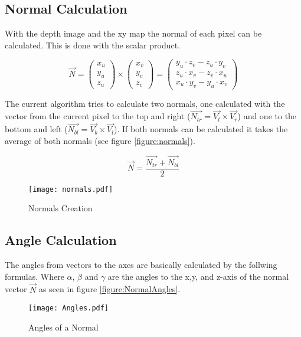 \subsection{Normal Calculation}
With the depth image and the xy map the normal of each pixel can be calculated. This is done with the scalar product.


$$ \vec{N} = \left( \begin{array}{c} x_u \\ y_u \\ z_u \end{array} \right) \times \left( \begin{array}{c} x_v \\ y_v \\ z_v \end{array} \right) 
= \left( \begin{array}{c} y_u \cdot z_v - z_u \cdot y_v \\ z_u \cdot x_v - z_v \cdot x_u \\ x_u \cdot y_v - y_u \cdot x_v \end{array}\right)
$$

The current algorithm tries to calculate two normals, one calculated with the vector from the current pixel to the top and right 
($\vec{N_{tr}}=\vec{V_t}\times\vec{V_r}$) and one to
the bottom and left ($\vec{N_{bl}}=\vec{V_b}\times\vec{V_l}$). 
If both normals can be calculated it takes the average of both normals (see figure \vref{figure:normals}).

$$ \vec{N} = \frac{\vec{N_{tr}} + \vec{N_{bl}}}{2}$$

\begin{figure}[htp]
\begin{center}
  \texttt{[image: normals.pdf]}
  \caption{Normals Creation}
  \label{figure:normals}
\end{center}
\end{figure}

\subsection{Angle Calculation}

The angles from vectors to the axes are basically calculated by the follwing formulas. Where $\alpha$, $\beta$ and $\gamma$ 
are the angles to the x,y, and z-axis of the normal vector $\vec{N}$ as seen in figure \vref{figure:NormalAngles}.

\begin{figure}[htp]
\begin{center}
  \texttt{[image: Angles.pdf]}
  \caption[labelInTOC]{Angles of a Normal}
  \label{figure:NormalAngles}
\end{center}
\end{figure}

